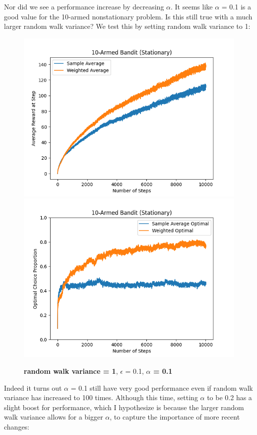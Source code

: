 \documentclass{article}
\begin{document}
\newpage
Nor did we see a performance increase by decreasing $\alpha$. It seems like $\alpha$ = 0.1 is a good value for the 10-armed nonstationary problem. Is this still true with a much larger random walk variance? We test this by setting random walk variance to 1:

\begin{figure}[h!]
\centering
\includegraphics[scale=.6]{RL_A1_pics/alpha/walk1alpha0.1.png}
\includegraphics[scale=.6]{RL_A1_pics/alpha/optimal/walk1alpha0.1.png}
\caption{\textbf{random walk variance = 1}, $\epsilon$ = 0.1, \textbf{$\alpha$ = 0.1}}
\label{fig:10-Armed1}
\end{figure}

\newpage
Indeed it turns out $\alpha$ = 0.1 still have very good performance even if random walk variance has increased to 100 times. Although this time, setting $\alpha$ to be 0.2 has a slight boost for performance, which I hypothesize is because the larger random walk variance allows for a bigger $\alpha$, to capture the importance of more recent changes:
\end{document}
